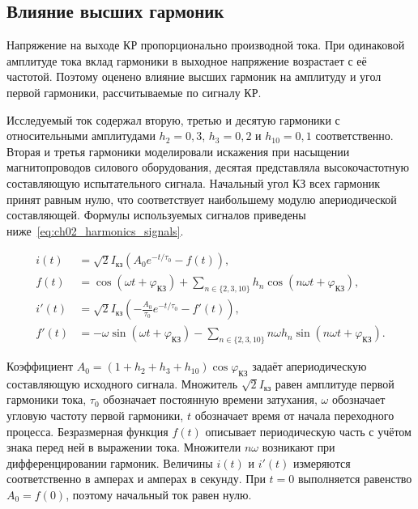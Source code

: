 \subsection{Влияние высших гармоник}
\label{sec:ch02_higher_harmonics}

Напряжение на выходе КР пропорционально производной тока. При одинаковой амплитуде тока
вклад гармоники в выходное напряжение возрастает с её частотой. Поэтому оценено влияние
высших гармоник на амплитуду и угол первой гармоники, рассчитываемые по сигналу КР.

Исследуемый ток содержал вторую, третью и десятую гармоники с относительными амплитудами $h_2=0{,}3$, $h_3=0{,}2$ и $h_{10}=0{,}1$ соответственно. Вторая и третья гармоники моделировали искажения при насыщении магнитопроводов силового оборудования, десятая представляла высокочастотную составляющую испытательного сигнала. Начальный угол КЗ всех гармоник принят равным нулю, что соответствует наибольшему модулю апериодической составляющей. Формулы используемых сигналов приведены ниже~\eqref{eq:ch02_harmonics_signals}.

\begin{equation}
\label{eq:ch02_harmonics_signals}
\begin{aligned}
i(t) &= \sqrt{2}I_{\text{кз}}\left(A_0 e^{-t/\tau_0}-f(t)\right),\\
f(t) &= \cos(\omega t+\varphi_{\text{КЗ}})
     + \sum_{n\in\{2,3,10\}} h_n \cos(n\omega t+\varphi_{\text{КЗ}}),\\
i'(t) &= \sqrt{2}I_{\text{кз}}
         \left(-\frac{A_0}{\tau_0} e^{-t/\tau_0}-f'(t)\right),\\
f'(t) &= -\omega\sin(\omega t+\varphi_{\text{КЗ}})
       - \sum_{n\in\{2,3,10\}} n\omega h_n \sin(n\omega t+\varphi_{\text{КЗ}}).
\end{aligned}
\end{equation}

Коэффициент $A_0=(1+h_2+h_3+h_{10})\cos\varphi_{\text{КЗ}}$ задаёт апериодическую
составляющую исходного сигнала. Множитель $\sqrt{2}I_{\text{кз}}$ равен амплитуде первой
гармоники тока, $\tau_0$ обозначает постоянную времени затухания, $\omega$ обозначает
угловую частоту первой гармоники, $t$ обозначает время от начала переходного процесса.
Безразмерная функция $f(t)$ описывает периодическую часть с учётом знака перед ней в
выражении тока. Множители $n\omega$ возникают при дифференцировании гармоник. Величины
$i(t)$ и $i'(t)$ измеряются соответственно в амперах и амперах в секунду.
При $t=0$ выполняется равенство $A_0=f(0)$, поэтому начальный ток равен нулю.


